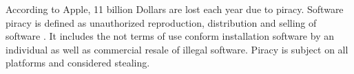 According to Apple, 11 billion Dollars are lost each year due to piracy.
Software piracy is defined as unauthorized reproduction, distribution and selling of software \cite{applePiracy}.
It includes the not terms of use conform installation software by an individual as well as commercial resale of illegal software.
Piracy is subject on all platforms and considered stealing.



%
%
%

%


%

